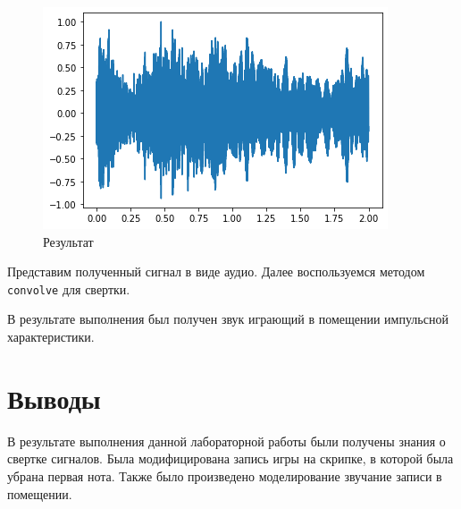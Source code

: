 \documentclass[a4paper, 14pt]{extarticle}
\begin{document}
    \begin{figure}[H]
        \centering
        \includegraphics[width=0.8\linewidth]{scream_result}
        \caption{Результат}
        \label{fig:scream_result}
    \end{figure}

    Представим полученный сигнал в виде аудио.
    Далее воспользуемся методом \texttt{convolve} для свертки.

    В результате выполнения был получен звук играющий в помещении импульсной характеристики.

    \newpage


    \section{Выводы}
    \label{sec:conclusions}

    В результате выполнения данной лабораторной работы были получены знания о свертке сигналов.
    Была модифицирована запись игры на скрипке, в которой была убрана первая нота.
    Также было произведено моделирование звучание записи в помещении.
\end{document}
